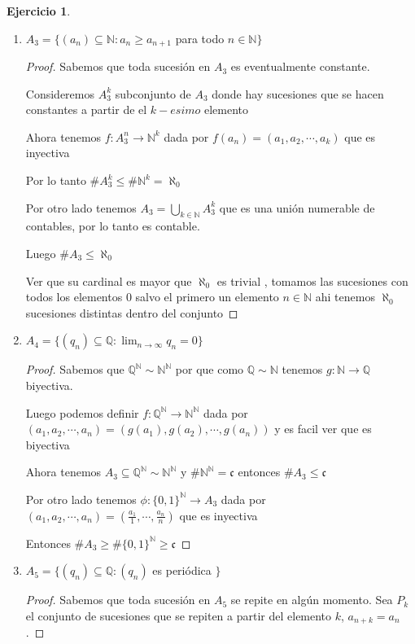 \documentclass[12pt]{article}
\newcommand{\n}{\aleph_{0}}
\newcommand{\Q}{\mathbb{Q}}
\newcommand{\N}{\mathbb{N}}
\newcommand{\ra}{\rightarrow}
\theoremstyle{definition}
\newtheorem{ej}{Ejercicio}
\begin{document}
\begin{ej}
\begin{enumerate}
\begin{proof}
      Ahora sabemos que $A_2 \subseteq A_2$ entonces $\# A_2 \leq \# A_1 = \mathfrak{c}$
    \end{proof}  
  \item $A_{3} = \{(a_{n}) \subseteq \N : a_{n} \geq a_{n +1} $ para todo $ n \in \N \}$
    \begin{proof}
    Sabemos que toda sucesión en $A_3$ es eventualmente constante. 

    Consideremos $A_3^k$ subconjunto de $A_3$ donde hay sucesiones que se hacen constantes a partir de el $k-esimo$ elemento

    Ahora tenemos $f: A_3^n \ra \N^k$ dada por $f(a_n) = (a_1,a_2,\cdots,a_k)$ que es inyectiva

    Por lo tanto $\# A_3^k \leq \# \N^k =\n$

    Por otro lado tenemos $A_3 = \bigcup_{k\in \N} A_3^k$ que es una unión numerable de contables, por lo tanto es contable.

    Luego $\# A_3 \leq \n$

    Ver que su cardinal es mayor que $\n$ es trivial , tomamos las sucesiones con todos los elementos 0 salvo el primero un elemento $n \in \N$ ahi tenemos $\n$ sucesiones distintas dentro del conjunto 
    \end{proof} 
  \item $A_{4} = \{ (q_{n}) \subseteq \Q : \lim_{n \ra \infty} q_{n} = 0\}$
    \begin{proof}

Sabemos que $\Q^{\N} \sim \N^{\N}$ por que como $\Q \sim \N$ tenemos $g: \N \ra \Q$ biyectiva.

Luego podemos definir $f: \Q^{\N} \ra \N^{\N}$ dada por $(a_1,a_2,\cdots,a_n) = (g(a_1),g(a_2),\cdots,g(a_n))$ y es facil ver que es biyectiva

Ahora tenemos $A_{3} \subseteq \Q^{\N} \sim \N^{\N}$ y $\# \N^{\N} = \mathfrak{c}$ entonces $\# A_{3} \leq \mathfrak{c}$

Por otro lado tenemos $\phi : \{0,1\}^{\N} \ra A_{3} $ dada por $(a_1,a_2,\cdots,a_{n}) = (\frac{a_1}{1},\cdots,\frac{a_{n}}{n})$ que es inyectiva

      Entonces $\# A_{3} \geq \# \{0,1\}^{\N} \geq \mathfrak{c}$

    \end{proof} 
  \item $A_{5} = \{ (q_{n}) \subseteq \Q : (q_{n}) $ es periódica $\}$
    \begin{proof}
      Sabemos que toda sucesión en $A_{5}$ se repite en algún momento. Sea $P_{k}$ el conjunto de sucesiones que se repiten a partir del elemento $k$, $a_{n + k} = a_{n}$. 


\end{proof}
\end{enumerate}
\end{ej}
\end{document}
